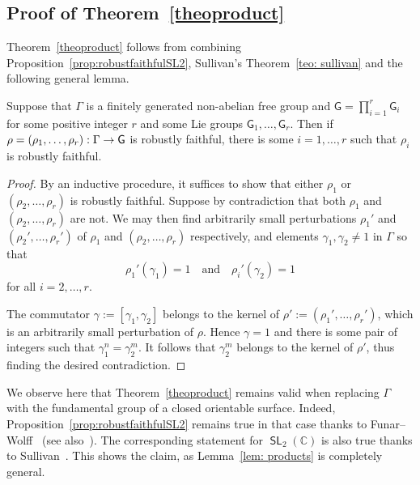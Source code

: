 \documentclass[AHL,Unicode,longabstracts]{cedram}
\DeclareMathOperator{\SL}{\mathsf{SL}}
\newcommand{\C}{\mathbb{C}}
\newcommand{\sG}{\mathsf{G}}
\renewcommand*{\to}{\mathchoice{\longrightarrow}{\rightarrow}{\rightarrow}{\rightarrow}}
\begin{document}
\subsection{Proof of Theorem~\ref{theoproduct}}\label{ss.prodSL2}

Theorem~\ref{theoproduct} follows from combining Proposition~\ref{prop:robustfaithfulSL2}, Sullivan's Theorem~\ref{teo: sullivan} and the following general lemma.

\begin{lemm}\label{lem: products}
Suppose that $\Gamma$ is a finitely generated non-abelian free group and
$\sG = \prod_{i=1}^{r} \sG_i$ for some positive integer $r$ and some Lie groups $\sG_1,\dots,\sG_r$. Then if $\rho=(\rho_1,\dots,\rho_{r}):\Gamma \to \sG$ is robustly faithful, there is some $i=1,\dots,r$ such that $\rho_i$ is robustly faithful.
\end{lemm}


\begin{proof}
By an inductive procedure, it suffices to show that either $\rho_{1}$ or $(\rho_2,\dots,\rho_{r})$ is robustly faithful. Suppose by contradiction that both $\rho_{1}$ and $(\rho_2,\dots,\rho_{r})$ are not.
We may then find arbitrarily small perturbations $\rho_{1}'$ and $(\rho_2',\dots,\rho_{r}')$ of $\rho_{1}$ and $(\rho_2,\dots,\rho_{r})$ respectively, and elements $\gamma_1,\gamma_2\neq 1$ in $\Gamma$ so that
\[
\rho_1'(\gamma_1)=1 \quad\text{and}\quad \rho_i'(\gamma_2)=1
\]
for all $i=2,\dots,r$.

The commutator $\gamma:=[\gamma_1,\gamma_2]$ belongs to the kernel of $\rho':=(\rho_1',\dots,\rho_{r}')$, which is an arbitrarily small perturbation of $\rho$. Hence $\gamma=1$ and there is some pair of integers such that $\gamma_1^{n}=\gamma_2^m$. It follows that $\gamma_2^{m}$ belongs to the kernel of $\rho'$, thus finding the desired contradiction.
\end{proof}



\begin{rema}\label{rem: surface groups in rank one products}
We observe here that Theorem~\ref{theoproduct} remains valid when replacing $\Gamma$ with the fundamental group of a closed orientable surface. Indeed, Proposition~\ref{prop:robustfaithfulSL2} remains true in that case thanks to Funar--Wolff~\cite[Theorem~1.1]{wolff} (see also~\cite{deblois}). The corresponding statement for $\SL_2(\C)$ is also true thanks to Sullivan~\cite[Theorem~A]{sullivan}. This shows the claim, as Lemma~\ref{lem: products} is completely general.
\end{rema}
\end{document}

